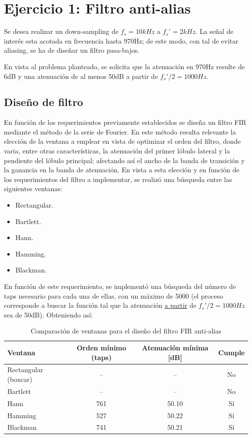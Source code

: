 \section{Ejercicio 1: Filtro anti-alias}
Se desea realizar un down-sampling de $f_s=10kHz$ a $f_s'=2kHz$. La señal de interés esta acotada en frecuencia hasta 970Hz; de este modo, con tal de evitar aliasing, se ha de diseñar un filtro pasa-bajos. 

En vista al problema planteado, se solicita que la atenuación en 970Hz resulte de 6dB y una atenuación de al menos 50dB a partir de $f_s'/2= 1000Hz$. 

\subsection{Diseño de filtro}
En función de los requerimientos previamente establecidos se diseña un filtro FIR mediante el método de la serie de Fourier. En este método resulta relevante la elección de la ventana a emplear en vista de optimizar el orden del filtro, donde varia, entre otras características, la atenuación del primer lóbulo lateral y la pendiente del lóbulo principal; afectando así el ancho de la banda de transición y la ganancia en la banda de atenuación. En vista a esta elección y en función de los requerimientos del filtro a implementar, se realizó una búsqueda entre las siguientes ventanas:

\begin{itemize}
    \item Rectangular.
    \item Bartlett.
    \item Hann.
    \item Hamming. 
    \item Blackman.
\end{itemize}

En función de este requerimiento, se implementó una búsqueda del número de taps necesario para cada una de ellas, con un máximo de 5000 (el proceso corresponde a buscar la función tal que la atenuación \underline{a partir} de $f_s'/2= 1000Hz$ sea de 50dB). Obteniendo así:

\vspace{1cm}
\begin{table}[H] 
\centering
\caption{Comparación de ventanas para el diseño del filtro FIR anti-alias}
\begin{tabular}{lccc}
\toprule
\textbf{Ventana} & \textbf{Orden mínimo (taps)} & \textbf{Atenuación mínima [dB]} & \textbf{Cumple} \\
\midrule
Rectangular (boxcar) & -- & -- & No \\
Bartlett             & -- & -- & No \\
Hann                 & 761 & 50.10 & Sí \\
Hamming              & 527 & 50.22 & Sí \\
Blackman             & 741 & 50.21 & Sí \\
\bottomrule
\end{tabular}
\label{tab: comparacion de ventanas}
\end{table}

